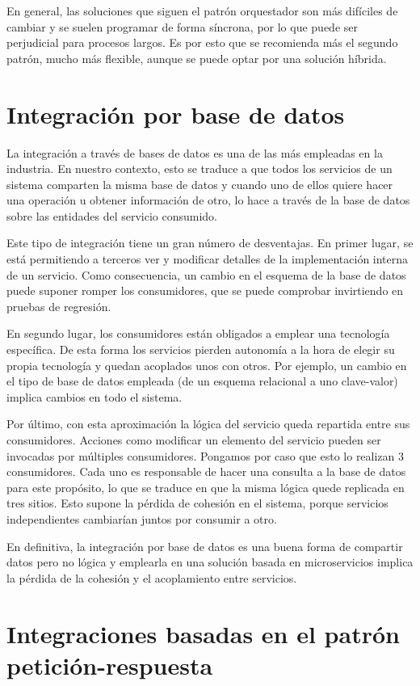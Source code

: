 \documentclass[11pt,a4paper]{article}
\begin{document}
En general, las soluciones que siguen el patrón orquestador son más difíciles de cambiar y se suelen programar de forma síncrona, por lo que puede ser perjudicial para procesos largos. Es por esto que se recomienda más el segundo patrón, mucho más flexible, aunque se puede optar por una solución híbrida.

\part{Integración por base de datos}

La integración a través de bases de datos es una de las más empleadas en la industria. En nuestro contexto, esto se traduce a que todos los servicios de un sistema comparten la misma base de datos y cuando uno de ellos quiere hacer una operación u obtener información de otro, lo hace a través de la base de datos sobre las entidades del servicio consumido. 

Este tipo de integración tiene un gran número de desventajas. En primer lugar, se está permitiendo a terceros ver y modificar detalles de la implementación interna de un servicio. Como consecuencia, un cambio en el esquema de la base de datos puede suponer romper los consumidores, que se puede comprobar invirtiendo en pruebas de regresión.

En segundo lugar, los consumidores están obligados a emplear una tecnología específica. De esta forma los servicios pierden autonomía a la hora de elegir su propia tecnología y quedan acoplados unos con otros. Por ejemplo, un cambio en el tipo de base de datos empleada (de un esquema relacional a uno clave-valor) implica cambios en todo el sistema.

Por último, con esta aproximación la lógica del servicio queda repartida entre sus consumidores. Acciones como modificar un elemento del servicio pueden ser invocadas por múltiples consumidores. Pongamos por caso que esto lo realizan 3 consumidores. Cada uno es responsable de hacer una consulta a la base de datos para este propósito, lo que se traduce en que la misma lógica quede replicada en tres sitios. Esto supone la pérdida de cohesión en el sistema, porque servicios independientes cambiarían juntos por consumir a otro.

En definitiva, la integración por base de datos es una buena forma de compartir datos pero no lógica y emplearla en una solución basada en microservicios implica la pérdida de la cohesión y el acoplamiento entre servicios.

\part{Integraciones basadas en el patrón petición-respuesta}
\end{document}
